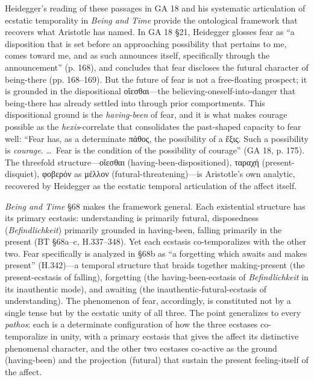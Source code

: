 \documentclass{article}
\newcommand{\gk}[1]{{\greekfont #1}}
\begin{document}
Heidegger's reading of these passages in GA 18 and his systematic articulation of ecstatic temporality in \textit{Being and Time} provide the ontological framework that recovers what Aristotle has named. In GA 18 \S21, Heidegger glosses fear as ``a disposition that is set before an approaching possibility that pertains to me, comes toward me, and as such announces itself, specifically through the announcement'' (p. 168), and concludes that fear discloses the futural character of being-there (pp. 168--169). But the future of fear is not a free-floating prospect; it is grounded in the dispositional \gk{οἴεσθαι}---the believing-oneself-into-danger that being-there has already settled into through prior comportments. This dispositional ground is the \textit{having-been} of fear, and it is what makes courage possible as the \textit{hexis}-correlate that consolidates the past-shaped capacity to fear well: ``Fear has, as a determinate \gk{πάθος}, the possibility of a \gk{ἕξις}. Such a possibility is \textit{courage}. \ldots\ Fear is the condition of the possibility of courage'' (GA 18, p. 175). The threefold structure---\gk{οἴεσθαι} (having-been-dispositioned), \gk{ταραχή} (present-disquiet), \gk{φοβερόν} as \gk{μέλλον} (futural-threatening)---is Aristotle's own analytic, recovered by Heidegger as the ecstatic temporal articulation of the affect itself.

\textit{Being and Time} \S68 makes the framework general. Each existential structure has its primary ecstasis: understanding is primarily futural, disposedness (\textit{Befindlichkeit}) primarily grounded in having-been, falling primarily in the present (BT \S68a--c, H.337--348). Yet each ecstasis co-temporalizes with the other two. Fear specifically is analyzed in \S68b as ``a forgetting which awaits and makes present'' (H.342)---a temporal structure that braids together making-present (the present-ecstasis of falling), forgetting (the having-been-ecstasis of \textit{Befindlichkeit} in its inauthentic mode), and awaiting (the inauthentic-futural-ecstasis of understanding). The phenomenon of fear, accordingly, is constituted not by a single tense but by the ecstatic unity of all three. The point generalizes to every \textit{pathos}: each is a determinate configuration of how the three ecstases co-temporalize in unity, with a primary ecstasis that gives the affect its distinctive phenomenal character, and the other two ecstases co-active as the ground (having-been) and the projection (futural) that sustain the present feeling-itself of the affect.
\end{document}
